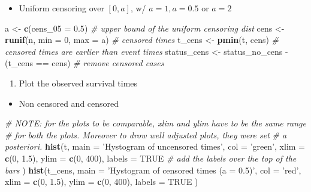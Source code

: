 \documentclass[]{book}
\newenvironment{Shaded}{\begin{snugshade}}{\end{snugshade}}
\newcommand{\KeywordTok}[1]{\textcolor[rgb]{0.13,0.29,0.53}{\textbf{{#1}}}}
\newcommand{\DataTypeTok}[1]{\textcolor[rgb]{0.13,0.29,0.53}{{#1}}}
\newcommand{\DecValTok}[1]{\textcolor[rgb]{0.00,0.00,0.81}{{#1}}}
\newcommand{\FloatTok}[1]{\textcolor[rgb]{0.00,0.00,0.81}{{#1}}}
\newcommand{\StringTok}[1]{\textcolor[rgb]{0.31,0.60,0.02}{{#1}}}
\newcommand{\CommentTok}[1]{\textcolor[rgb]{0.56,0.35,0.01}{\textit{{#1}}}}
\newcommand{\OtherTok}[1]{\textcolor[rgb]{0.56,0.35,0.01}{{#1}}}
\newcommand{\NormalTok}[1]{{#1}}
\providecommand{\tightlist}{%
  \setlength{\itemsep}{0pt}\setlength{\parskip}{0pt}}
\theoremstyle{definition}
\theoremstyle{definition}
\theoremstyle{definition}
\theoremstyle{remark}
\begin{document}
\begin{itemize}
\tightlist
\item
  Uniform censoring over \([0, a]\), w/ \(a = 1, a = 0.5\) or \(a = 2\)
\end{itemize}

\begin{Shaded}
\begin{Highlighting}[]
\NormalTok{a              <-}\StringTok{ }\KeywordTok{c}\NormalTok{(}\DataTypeTok{cens_05 =} \FloatTok{0.5}\NormalTok{)   }\CommentTok{# upper bound of the uniform censoring dist}
\NormalTok{cens           <-}\StringTok{ }\KeywordTok{runif}\NormalTok{(n, }\DataTypeTok{min =} \DecValTok{0}\NormalTok{, }\DataTypeTok{max =} \NormalTok{a)                    }\CommentTok{# censored times}
\NormalTok{t_cens         <-}\StringTok{ }\KeywordTok{pmin}\NormalTok{(t, cens)    }\CommentTok{# censored times are earlier than event times}
\NormalTok{status_cens    <-}\StringTok{ }\NormalTok{status_no_cens -}\StringTok{ }\NormalTok{(t_cens ==}\StringTok{ }\NormalTok{cens)      }\CommentTok{# remove censored cases}
\end{Highlighting}
\end{Shaded}

\begin{enumerate}
\def\labelenumi{\arabic{enumi}.}
\setcounter{enumi}{1}
\tightlist
\item
  Plot the observed survival times
\end{enumerate}

\begin{itemize}
\tightlist
\item
  Non censored and censored
\end{itemize}

\begin{Shaded}
\begin{Highlighting}[]
\CommentTok{# NOTE: for the plots to be comparable, xlim and ylim have to be the same range}
\CommentTok{#       for both the plots. Moreover to drow well adjusted plots, they were set}
\CommentTok{#       a posteriori.}
\KeywordTok{hist}\NormalTok{(t,}
  \DataTypeTok{main =} \StringTok{'Hystogram of uncensored times'}\NormalTok{,}
  \DataTypeTok{col  =} \StringTok{'green'}\NormalTok{,}
  \DataTypeTok{xlim =} \KeywordTok{c}\NormalTok{(}\DecValTok{0}\NormalTok{, }\FloatTok{1.5}\NormalTok{),}
  \DataTypeTok{ylim =} \KeywordTok{c}\NormalTok{(}\DecValTok{0}\NormalTok{, }\DecValTok{400}\NormalTok{),}
  \DataTypeTok{labels =} \OtherTok{TRUE}                        \CommentTok{# add the labels over the top of the bars}
\NormalTok{)}
\KeywordTok{hist}\NormalTok{(t_cens,}
  \DataTypeTok{main =} \StringTok{'Hystogram of censored times (a = 0.5)'}\NormalTok{,}
  \DataTypeTok{col  =} \StringTok{'red'}\NormalTok{,}
  \DataTypeTok{xlim =} \KeywordTok{c}\NormalTok{(}\DecValTok{0}\NormalTok{, }\FloatTok{1.5}\NormalTok{),}
  \DataTypeTok{ylim =} \KeywordTok{c}\NormalTok{(}\DecValTok{0}\NormalTok{, }\DecValTok{400}\NormalTok{),}
  \DataTypeTok{labels =} \OtherTok{TRUE}
\NormalTok{)}
\end{Highlighting}
\end{Shaded}
\end{document}
